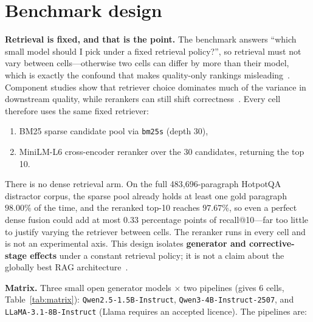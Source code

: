 
\section{Benchmark design}
\label{sec:design}

\textbf{Retrieval is fixed, and that is the point.}
The benchmark answers ``which small model should I pick under a fixed
retrieval policy?'', so retrieval must not vary between cells---otherwise
two cells can differ by more than their model, which is exactly the
confound that makes quality-only rankings misleading~\cite{elkiran2026empirical}.
Component studies show that retriever choice dominates much of the
variance in downstream quality, while rerankers can still shift
correctness~\cite{elkiran2026empirical}. Every cell therefore uses the
same fixed retriever:

\begin{enumerate}
    \item BM25 sparse candidate pool via \texttt{bm25s} (depth 30),
    \item MiniLM-L6 cross-encoder reranker over the 30 candidates,
          returning the top 10.
\end{enumerate}

There is no dense retrieval arm. On the full 483,696-paragraph HotpotQA
distractor corpus, the sparse pool already holds at least one gold
paragraph $98.00\%$ of the time, and the reranked top-10 reaches
$97.67\%$, so even a perfect dense fusion could add at most $0.33$
percentage points of recall@10---far too little to justify varying the
retriever between cells. The reranker runs in every cell and is not an
experimental axis. This design isolates \textbf{generator and
corrective-stage effects} under a constant retrieval policy; it is not a
claim about the globally best RAG architecture~\cite{elkiran2026empirical}.

\textbf{Matrix.} Three small open generator models $\times$ two pipelines
(gives 6 cells, Table~\ref{tab:matrix}): \texttt{Qwen2.5-1.5B-Instruct},
\texttt{Qwen3-4B-Instruct-2507}, and \texttt{LLaMA-3.1-8B-Instruct}
(Llama requires an accepted licence). The pipelines are:

